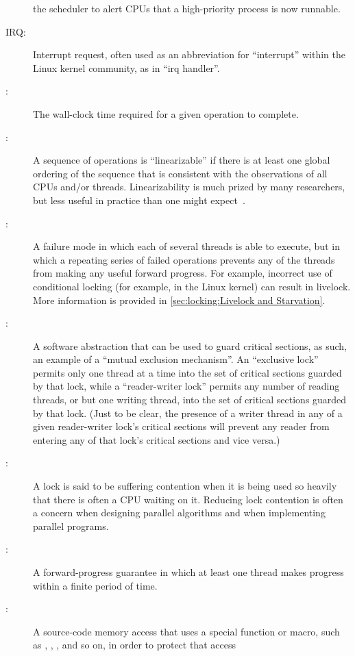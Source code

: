 \begin{description}
	the scheduler to alert CPUs that a high-priority process is now
	runnable.
\item[IRQ:]
	Interrupt request, often used as an abbreviation for ``interrupt''
	within the Linux kernel community, as in ``irq handler''.
\item[\IXG{Latency}:]
	The wall-clock time required for a given operation to complete.
\item[\IXG{Linearizable}:]
	A sequence of operations is ``linearizable'' if there is at
	least one global ordering of the sequence that is consistent
	with the observations of all CPUs and/or threads.
	Linearizability is much prized by many researchers, but less
	useful in practice than one might
	expect~\cite{AndreasHaas2012FIFOisnt}.
\item[\IXG{Livelock}:]
	A failure mode in which each of several threads is able to
	execute, but in which a repeating series of failed operations
	prevents any of the threads from making any useful forward progress.
	For example, incorrect use of conditional locking
	(for example,  in the Linux kernel)
	can result in livelock.
	More information is provided in
	\cref{sec:locking:Livelock and Starvation}.
\item[\IXG{Lock}:]
	A software abstraction that can be used to guard critical sections,
	as such, an example of a ``mutual exclusion mechanism''.
	An ``exclusive lock'' permits only one thread at a time into the
	set of critical sections guarded by that lock, while a
	``reader-writer lock'' permits any number of reading
	threads, or but one writing thread, into the set of critical
	sections guarded by that lock.
	(Just to be clear, the presence	of a writer thread in any of
	a given reader-writer lock's critical sections will prevent
	any reader from entering any of that lock's critical sections
	and vice versa.)
\item[\IXG{Lock Contention}:]
	A lock is said to be suffering contention when it is being
	used so heavily that there is often a CPU waiting on it.
	Reducing lock contention is often a concern when designing
	parallel algorithms and when implementing parallel programs.
\item[\IXG{Lock Free}:]
	A forward-progress guarantee in which at least one thread makes
	progress within a finite period of time.
\item[\IXG{Marked Access}:]
	A source-code memory access that uses a special function or
	macro, such as , ,
	, and so on, in order to protect that access

\end{description}
